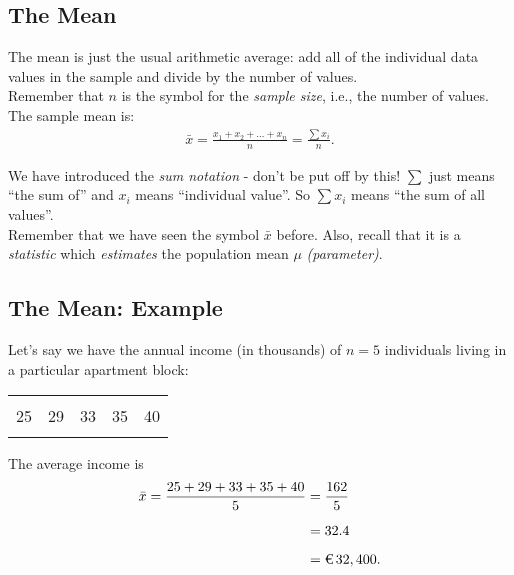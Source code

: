 \subsection{The Mean}
\begin{frame}{\bf {}}
The mean is just the usual arithmetic average: add all of the individual data values in the sample and divide by the number of values.\\[0.5cm]
Remember that {\boldmath$n$} is the symbol for the \emph{sample size}, i.e., the number of values. The sample mean is:\\[-0.6cm]

\begin{align*}
\boxed{\bar x = \frac{x_1 + x_2 + \ldots + x_n}{n} = \frac{\sum x_i}{n}}.
\end{align*}

We have introduced the \emph{sum notation} - don't be put off by this! $\sum$ just means ``the sum of'' and $x_i$ means ``individual value''. So $\sum x_i$ means ``the sum of all values''.\\[0.4cm]
Remember that we have seen the symbol $\bar x$ before. Also, recall that it is a \emph{statistic} which \emph{estimates} the population mean $\mu$ \emph{(parameter)}.

\end{frame}

\subsection{The Mean: Example}
\begin{frame}{\bf {}}
Let's say we have the annual income (in thousands) of $n = 5$ individuals living in a particular apartment block:
\begin{center}
\begin{tabular}{|ccccc|}
\hline
&&&&\\[-0.4cm]
25 & 29 & 33 & 35 & 40 \\
\hline
\multicolumn{5}{c}{}\\
\end{tabular}
\end{center}
The average income is
\begin{align*}
\bar x = \frac{25 + 29 + 33 + 35 + 40}{5} &= \frac{162}{5} \\[0.2cm]
&= 32.4 \\[0.2cm]
&= \text{\texteuro\,} 32,400.
\end{align*}


\end{frame}



